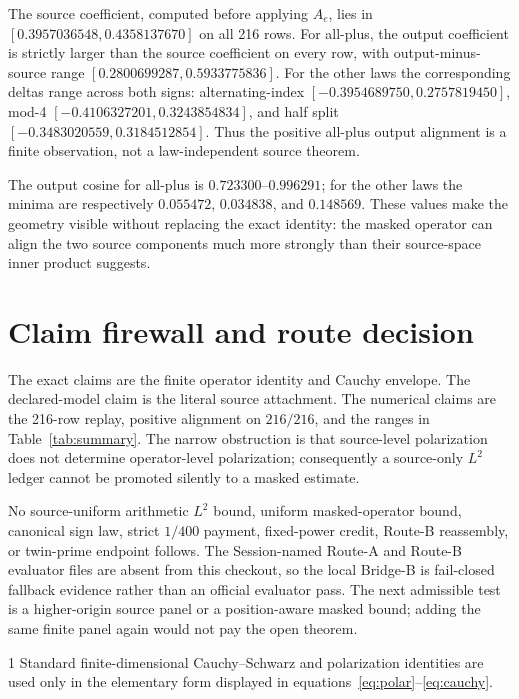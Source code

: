 \documentclass[10pt]{article}
\begin{document}
The source coefficient, computed before applying $A_e$, lies in
$[0.3957036548,0.4358137670]$ on all 216 rows.  For all-plus, the output
coefficient is strictly larger than the source coefficient on every row, with
output-minus-source range
$[0.2800699287,0.5933775836]$.  For the other laws the corresponding deltas
range across both signs: alternating-index
$[-0.3954689750,0.2757819450]$, mod-4
$[-0.4106327201,0.3243854834]$, and half split
$[-0.3483020559,0.3184512854]$.  Thus the positive all-plus output alignment
is a finite observation, not a law-independent source theorem.

The output cosine for all-plus is $0.723300$--$0.996291$; for the other laws
the minima are respectively $0.055472$, $0.034838$, and $0.148569$.
These values make the geometry visible without replacing the exact identity:
the masked operator can align the two source components much more strongly
than their source-space inner product suggests.

\section{Claim firewall and route decision}

The exact claims are the finite operator identity and Cauchy envelope.  The
declared-model claim is the literal source attachment.  The numerical claims
are the 216-row replay, positive alignment on $216/216$, and the ranges in
Table~\ref{tab:summary}.  The narrow obstruction is that source-level
polarization does not determine operator-level polarization; consequently a
source-only $L^2$ ledger cannot be promoted silently to a masked estimate.

No source-uniform arithmetic $L^2$ bound, uniform masked-operator bound,
canonical sign law, strict $1/400$ payment, fixed-power credit, Route-B
reassembly, or twin-prime endpoint follows.  The Session-named Route-A and
Route-B evaluator files are absent from this checkout, so the local Bridge-B
is fail-closed fallback evidence rather than an official evaluator pass.
The next admissible test is a higher-origin source panel or a
position-aware masked bound; adding the same finite panel again would not pay
the open theorem.

\begin{thebibliography}{1}
Standard finite-dimensional Cauchy--Schwarz and polarization identities are
used only in the elementary form displayed in equations~\eqref{eq:polar}--\eqref{eq:cauchy}.
\end{thebibliography}
\end{document}
